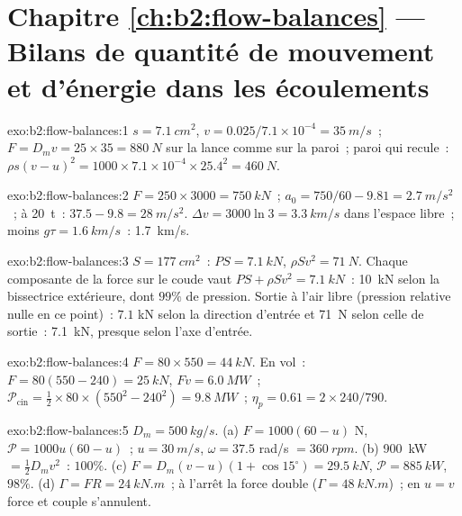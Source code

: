 \section*{Chapitre \ref{ch:b2:flow-balances} --- Bilans de quantité de mouvement et d'énergie dans les écoulements}

\begin{solution}{exo:b2:flow-balances:1}
$s = \qty{7.1}{cm^2}$, $v = 0.025/7.1 \times 10^{-4} = \qty{35}{m/s}$~; $F = D_mv = 25
\times 35 = \qty{880}{N}$ sur la lance comme sur la paroi~; paroi qui recule~: $\rho s(v -
u)^2 = 1000 \times 7.1 \times 10^{-4} \times 25.4^2 = \qty{460}{N}$.
\end{solution}

\begin{solution}{exo:b2:flow-balances:2}
$F = 250 \times 3000 = \qty{750}{kN}$~; $a_0 = 750/60 - 9.81 = \qty{2.7}{m/s^2}$~; à
\qty{20}{t}~: $37.5 - 9.8 = \qty{28}{m/s^2}$. $\Delta v = 3000\ln3 = \qty{3.3}{km/s}$ dans
l'espace libre~; moins $g\tau = \qty{1.6}{km/s}$~: \qty{1.7}{km/s}.
\end{solution}

\begin{solution}{exo:b2:flow-balances:3}
$S = \qty{177}{cm^2}$~: $PS = \qty{7.1}{kN}$, $\rho Sv^2 = \qty{71}{N}$. Chaque composante
de la force sur le coude vaut $PS + \rho Sv^2 = \qty{7.1}{kN}$~: \qty{10}{kN} selon
la bissectrice extérieure, dont $99\%$ de pression. Sortie à l'air libre (pression relative
nulle en ce point)~: $7.1$ kN selon la direction d'entrée et \qty{71}{N} selon celle de
sortie~: \qty{7.1}{kN}, presque selon l'axe d'entrée.
\end{solution}

\begin{solution}{exo:b2:flow-balances:4}
$F = 80 \times 550 = \qty{44}{kN}$. En vol~: $F = 80(550 - 240) = \qty{25}{kN}$, $Fv =
\qty{6.0}{MW}$~; $\mathcal P_{\text{cin}} = \tfrac12 \times 80 \times (550^2 - 240^2) =
\qty{9.8}{MW}$~; $\eta_p = 0.61 = 2 \times 240/790$.
\end{solution}

\begin{solution}{exo:b2:flow-balances:5}
$D_m = \qty{500}{kg/s}$. (a) $F = 1000(60 - u)$ N, $\mathcal P = 1000u(60 - u)$~; $u =
\qty{30}{m/s}$, $\omega = 37.5$ rad/s $= \qty{360}{rpm}$. (b) \qty{900}{kW} $=
\tfrac12D_mv^2$~: $100\%$. (c) $F = D_m(v - u)(1 + \cos15^\circ) = \qty{29.5}{kN}$, $\mathcal P
= \qty{885}{kW}$, $98\%$. (d) $\Gamma = FR = \qty{24}{kN.m}$~; à l'arrêt la force
double ($\Gamma = \qty{48}{kN.m}$)~; en $u = v$ force et couple s'annulent.
\end{solution}

